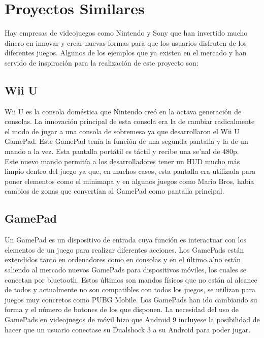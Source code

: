 \section{Proyectos Similares}

\label{cap2:sec:proyectos-similares}

Hay empresas de videojuegos como Nintendo y Sony que han invertido mucho dinero en innovar y crear nuevas formas para que los usuarios disfruten de los diferentes juegos. Algunos de los ejemplos que ya existen en el mercado y han servido de inspiraci\'on para la realizaci\'on de este proyecto son:

\subsection{Wii U}
\label{cap2:subsec:Wii U}

Wii U es la consola dom\'estica que Nintendo cre\'o en la octava generaci\'on de consolas. La innovaci\'on principal de esta consola era la de cambiar radicalmente el modo de jugar a una consola de sobremesa ya que desarrollaron el Wii U GamePad. Este GamePad ten\'ia la funci\'on de una segunda pantalla y la de un mando a la vez. Esta pantalla port\'atil es t\'actil y recibe una se'nal de 480p.
\\
 Este nuevo mando permit\'ia a los desarrolladores tener un HUD mucho m\'as limpio dentro del juego ya que, en muchos casos, esta pantalla era utilizada para poner elementos como el minimapa y en algunos juegos como Mario Bros, hab\'ia cambios de zonas que convert\'ian al GamePad como pantalla principal. \\

\subsection{GamePad}
\label{cap2:subsec:GamePad}

Un GamePad es un dispositivo de entrada cuya funci\'on es interactuar con los elementos de un juego para realizar diferentes acciones. Los GamePads est\'an extendidos tanto en ordenadores como en consolas y en el \'ultimo a'no est\'an saliendo al mercado nuevos GamePads para dispositivos m\'oviles, los cuales se conectan por bluetooth. Estos \'ultimos son mandos f\'isicos que no est\'an al alcance de todos y actualmente no son compatibles con todos los juegos, se utilizan para juegos muy concretos como PUBG Mobile. Los GamePads han ido cambiando su forma y el n\'umero de botones de los que disponen. La necesidad del uso de GamePads en videojuegos de m\'ovil hizo que Android 9 incluyese la posibilidad de hacer que un usuario conectase su Dualshock 3 a su Android para poder jugar.

